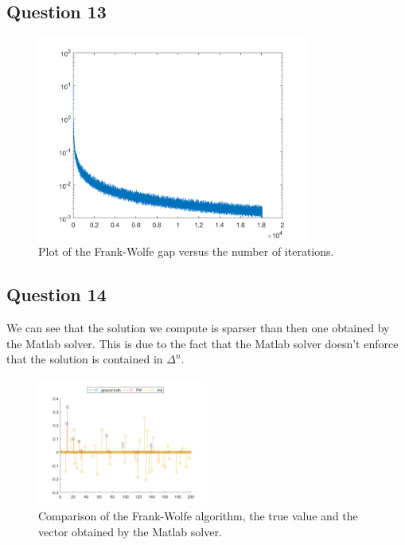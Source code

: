 \documentclass[12p]{article}
\begin{document}
\subsection*{Question 13} 


\begin{figure}[h]
    \centering
    \includegraphics[width=0.8\textwidth]{gaps.png}
    \caption{Plot of the Frank-Wolfe gap versus the number of iterations.}
    \label{fig:my_label}
\end{figure}
\pagebreak
\subsection*{Question 14} 
We can see that the solution we compute is sparser than then one obtained by the Matlab solver. This is due to the fact that the Matlab solver doesn't enforce that the solution is contained in \(\Delta^n\).
\begin{figure}[h]
    \centering
    \includegraphics[width=0.5\textwidth]{compare.png}
    \caption{Comparison of the Frank-Wolfe algorithm, the true value and the vector obtained by the Matlab solver.}
    \label{fig:next}
\end{figure}
\end{document}
